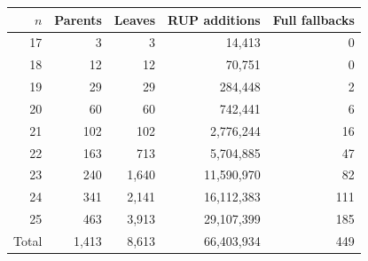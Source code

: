 \begin{tabular}{@{}rrrrr@{}}
\toprule
$n$&Parents&Leaves&RUP additions&Full fallbacks\\
\midrule
17&3&3&14,413&0\\
18&12&12&70,751&0\\
19&29&29&284,448&2\\
20&60&60&742,441&6\\
21&102&102&2,776,244&16\\
22&163&713&5,704,885&47\\
23&240&1,640&11,590,970&82\\
24&341&2,141&16,112,383&111\\
25&463&3,913&29,107,399&185\\
\midrule
Total&1,413&8,613&66,403,934&449\\
\bottomrule
\end{tabular}
